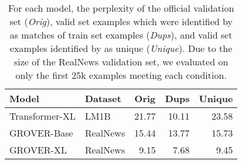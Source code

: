 

\begin{table}[]
    \caption{For each model, the perplexity of the official validation set (\textit{Orig}), valid set examples which were identified by \Approx{} as matches of train set examples (\textit{Dups}), and valid set examples identified by \Approx{} as unique (\textit{Unique}).
    Due to the size of the RealNews validation set, we evaluated on only the first 25k examples meeting each condition.}
    \label{tab:ppl_sota_models}
    \centering
    \small
    \begin{tabular}{ll|rrr}
    \toprule
    Model & Dataset & \multicolumn{1}{c}{Orig} & \multicolumn{1}{c}{Dups} & \multicolumn{1}{c}{Unique} \\
    \midrule
    Transformer-XL & LM1B & 21.77 & 10.11  & 23.58  \\
    GROVER-Base  & RealNews & 15.44 & 13.77 & 15.73  \\
    GROVER-XL & RealNews & 9.15 & 7.68 & 9.45 \\
    \bottomrule
    \end{tabular}
\end{table}